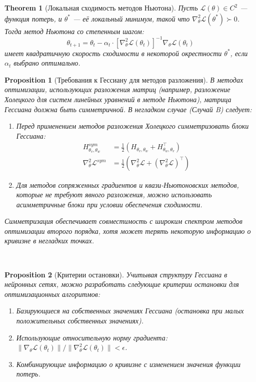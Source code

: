 \documentclass[11pt]{article}
\newtheorem{theorem}{Theorem}
\newtheorem{proposition}{Proposition}
\begin{document}
\begin{theorem}[Локальная сходимость методов Ньютона]
  Пусть $\mathcal{L}(\theta) \in C^2$ — функция потерь, и $\theta^*$ — её локальный минимум, такой что
  $\nabla^2_\theta \mathcal{L}(\theta^*) \succ 0$. Тогда метод Ньютона со степенным шагом:
  \[
    \theta_{t+1} = \theta_t - \alpha_t \cdot [\nabla^2_\theta \mathcal{L}(\theta_t)]^{-1} \nabla_\theta
    \mathcal{L}(\theta_t)
  \]
  имеет квадратичную скорость сходимости в некоторой окрестности $\theta^*$, если $\alpha_t$ выбрано оптимально.
\end{theorem}

\begin{proposition}[Требования к Гессиану для методов разложения]
  В методах оптимизации, использующих разложения матриц (например, разложение Холецкого для систем линейных
  уравнений в методе Ньютона), матрица Гессиана должна быть симметричной. В негладком случае (Случай B) следует:
  \begin{enumerate}
    \item Перед применением методов разложения Холецкого симметризовать блоки Гессиана:
      \begin{align}
        H_{\theta_v, \theta_w}^{sym} &= \frac{1}{2}(H_{\theta_v, \theta_w} + H_{\theta_w, \theta_v}^\top) \\
        \nabla^2_\theta \mathcal{L}^{sym} &= \frac{1}{2}(\nabla^2_\theta \mathcal{L} + (\nabla^2_\theta
        \mathcal{L})^\top)
      \end{align}
    \item Для методов сопряженных градиентов и квази-Ньютоновских методов, которые не требуют явного
      разложения, можно использовать асимметричные блоки при условии обеспечения сходимости.
  \end{enumerate}
  Симметризация обеспечивает совместимость с широким спектром методов оптимизации второго порядка, хотя может
  терять некоторую информацию о кривизне в негладких точках.
\end{proposition}
\
\begin{proposition}[Критерии остановки]
  Учитывая структуру Гессиана в нейронных сетях, можно разработать следующие критерии остановки для
  оптимизационных алгоритмов:
  \begin{enumerate}
    \item Базирующиеся на собственных значениях Гессиана (остановка при малых положительных собственных значениях).
    \item Использующие относительную норму градиента: $\|\nabla_\theta \mathcal{L}(\theta_t)\| /
      \|\nabla^2_\theta \mathcal{L}(\theta_t)\| < \epsilon$.
    \item Комбинирующие информацию о кривизне с изменением значения функции потерь.
  \end{enumerate}
\end{proposition}
\end{document}
